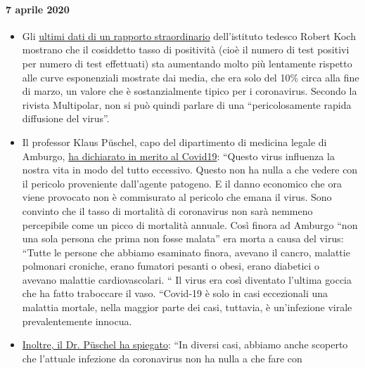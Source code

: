 \hypertarget{7-aprile-2020}{%
\paragraph{7 aprile 2020}\label{7-aprile-2020}}

\begin{itemize}
\tightlist
\item
  Gli
  \href{https://multipolar-magazin.de/artikel/coronavirus-regierung-ignoriert-daten}{ultimi
  dati di un rapporto straordinario} dell'istituto tedesco Robert Koch
  mostrano che il cosiddetto tasso di positività (cioè il numero di test
  positivi per numero di test effettuati) sta aumentando molto più
  lentamente rispetto alle curve esponenziali mostrate dai media, che
  era solo del 10\% circa alla fine di marzo, un valore che è
  sostanzialmente tipico per i coronavirus. Secondo la rivista
  Multipolar, non si può quindi parlare di una ``pericolosamente rapida
  diffusione del virus''.
\item
  Il professor Klaus Püschel, capo del dipartimento di medicina legale
  di Amburgo,
  \href{https://www.pressreader.com/germany/hamburger-morgenpost/20200403/281487868456736}{ha
  dichiarato in merito al Covid19}: ``Questo virus influenza la nostra
  vita in modo del tutto eccessivo. Questo non ha nulla a che vedere con
  il pericolo proveniente dall'agente patogeno. E il danno economico che
  ora viene provocato non è commisurato al pericolo che emana il virus.
  Sono convinto che il tasso di mortalità di coronavirus non sarà
  nemmeno percepibile come un picco di mortalità annuale. Così finora ad
  Amburgo ``non una sola persona che prima non fosse malata'' era morta
  a causa del virus: ``Tutte le persone che abbiamo esaminato finora,
  avevano il cancro, malattie polmonari croniche, erano fumatori pesanti
  o obesi, erano diabetici o~ avevano malattie cardiovascolari. `` Il
  virus era così diventato l'ultima goccia che ha fatto traboccare il
  vaso. ``Covid-19 è solo in casi eccezionali una malattia mortale,
  nella maggior parte dei casi, tuttavia, è un'infezione virale
  prevalentemente innocua.
\item
  \href{https://www.abendblatt.de/hamburg/article228828787/rechtsmedizin-pueschel-hamburg-corona-virus-infektion-covid-19-coronavirus-krise-patienten-krankenhaeuser-kliniken-infektionsrate-krankheit-pandemie-test-lungenkrankheit-sars-cov-epidemie-sars-cov-2.html}{Inoltre,
  il Dr. Püschel ha spiegato}: ``In diversi casi, abbiamo anche scoperto
  che l'attuale infezione da coronavirus non ha nulla a che fare con

\end{itemize}
